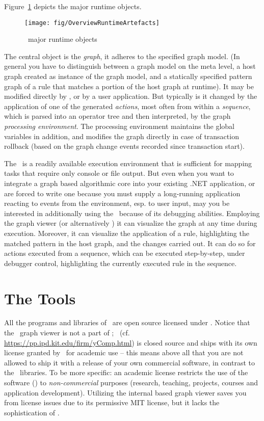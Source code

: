 Figure~\ref{process} depicts the major runtime objects.

\begin{figure}[htbp]
  \centering
  \texttt{[image: fig/OverviewRuntimeArtefacts]}
  \caption{\GrG\ major runtime objects}
  \label{process}
\end{figure}

The central object is the \emph{graph}, it adheres to the specified graph model.
(In general you have to distinguish between a graph model on the meta level, a host graph created as instance of the graph model, and a statically specified pattern graph of a rule that matches a portion of the host graph at runtime).
It may be modified directly by \GrShell, or by a user application.
But typically is it changed by the application of one of the generated \emph{actions}, most often from within a \emph{sequence}, which is parsed into an operator tree and then interpreted, by the graph \emph{processing environment}.
The processing environment maintains the global variables in addition, and modifies the graph directly in case of transaction rollback (based on the graph change events recorded since transaction start).

The \GrShell\ is a readily available execution environment that is sufficient for mapping tasks that require only console or file output.
But even when you want to integrate a graph based algorithmic core into your existing .NET application, 
or are forced to write one because you must supply a long-running application reacting to events from the environment, esp. to user input,
may you be interested in additionally using the \GrShell\ because of its debugging abilities.
Employing the graph viewer \yComp{}(or alternatively \MSAGL{}) it can visualize the graph at any time during execution.
Moreover, it can visualize the application of a rule, highlighting the matched pattern in the host graph, and the changes carried out.
It can do so for actions executed from a sequence, which can be executed step-by-step, under debugger control, highlighting the currently executed rule in the sequence.

\section{The Tools}

All the programs and libraries of \GrG\ are open source licensed under \cite{LGPL3}.
Notice that the \yComp\ graph viewer is not a part of \GrG ; \yComp\ (cf. \url{https://pp.ipd.kit.edu/firm/yComp.html}) is closed source and ships with its own license granted by \yFiles\ for academic use --
this means above all that you are not allowed to ship it with a release of your own commercial software, in contrast to the \GrG\ libraries.
To be more specific: an academic license restricts the use of the software (\yComp) to \emph{non-commercial} purposes (research, teaching, projects, courses and application development).
Utilizing the internal \MSAGL{} based graph viewer saves you from license issues due to its permissive MIT license, but it lacks the sophistication of \yComp{}.


